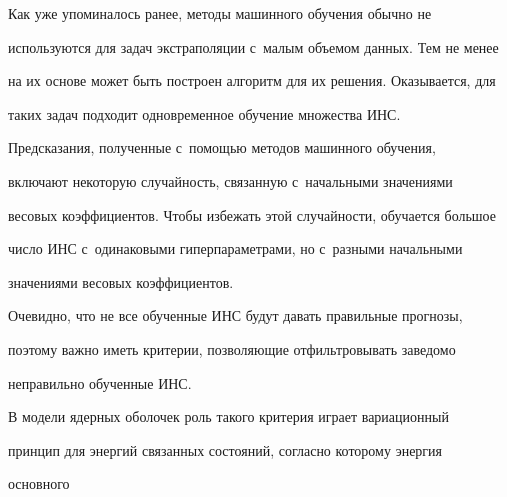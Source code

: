   Как уже упоминалось ранее, методы машинного обуче\-ния обычно не 


используются для задач экстраполяции с~малым объемом данных. Тем не менее 


на их основе может быть построен алгоритм для их решения. Оказывается, для 


таких задач подходит одновременное обуче\-ние множества ИНС.


  


  Предсказания, полученные с~помощью методов машинного обуче\-ния, 


включают некоторую слу\-чай\-ность, связанную с~начальными значениями 


весовых коэффициентов. Чтобы избежать этой слу\-чай\-ности, обуча\-ет\-ся большое 


чис\-ло ИНС с~одинаковыми ги\-пер\-па\-ра\-мет\-ра\-ми, но с~разными начальными 


значениями весовых коэффициентов. 








  


  Очевидно, что не все обученные ИНС будут давать правильные прогнозы, 


поэтому важ\-но иметь критерии, поз\-во\-ля\-ющие от\-фильт\-ро\-вы\-вать заведомо 


неправильно обучен\-ные ИНС.


  


  В модели ядерных оболочек роль такого критерия играет вариационный 


принцип для энергий связанных со\-сто\-яний, со\-глас\-но которому энергия 


основного\linebreak\vspace*{-12pt}





